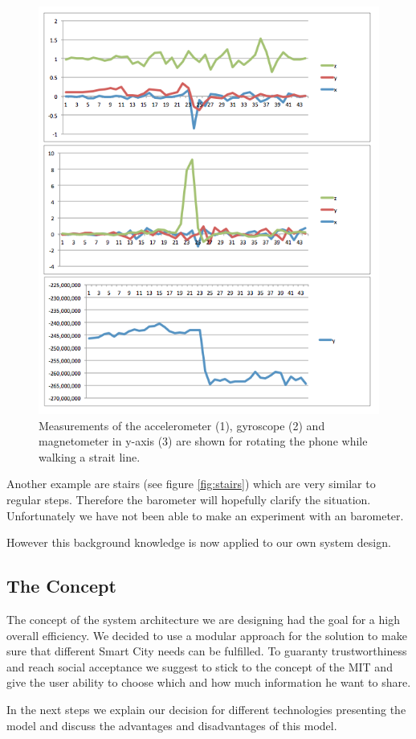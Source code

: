 \begin{figure}[h]
	\centering
		\includegraphics[width=.6\textwidth]{images/experiments/rotateWhileWalking.png}
	\caption{Measurements of the accelerometer (1), gyroscope (2) and magnetometer in y-axis (3) are shown for rotating the phone while walking a strait line.}
	\label{fig:rotateWhileWalking}
\end{figure}

Another example are stairs (see figure \ref{fig:stairs}) which are very similar to regular steps. Therefore the barometer will hopefully clarify the situation. Unfortunately we have not been able to make an experiment with an barometer. 



However this background knowledge is now applied to our own system design.


\pagebreak
\subsection{The Concept} 
The concept of the system architecture we are designing had the goal for a high overall efficiency. We decided to use a modular approach for the solution to make sure that different Smart City needs can be fulfilled. To guaranty trustworthiness and reach social acceptance we suggest to stick to the concept of the MIT and give the user ability to choose which and how much information he want to share. 

In the next steps we explain our decision for different technologies presenting the model and discuss the advantages and disadvantages of this model.

